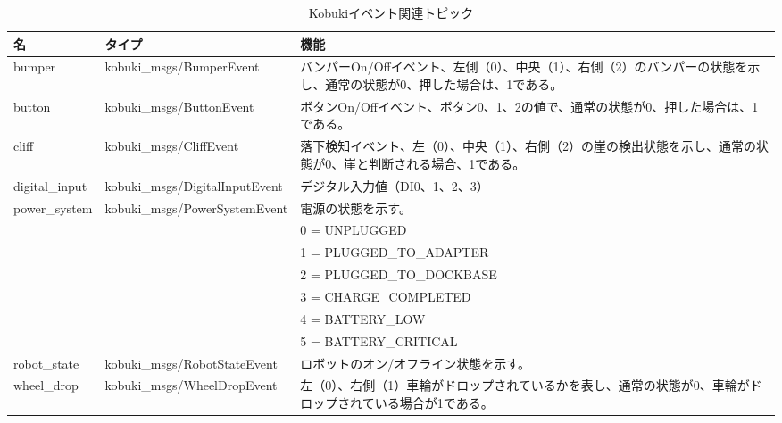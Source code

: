 \begin{itemize}
\begin{table}[htp]
\centering
\begin{tabular}{p{2cm} p{5cm} p{6cm}}
\toprule
\textbf{名} & \textbf{タイプ} & \textbf{機能}\\
\midrule
bumper & kobuki\_msgs/BumperEvent & バンパーOn/Offイベント、左側（0）、中央（1）、右側（2）のバンパーの状態を示し、通常の状態が0、押した場合は、1である。} \\
button & kobuki\_msgs/ButtonEvent & ボタンOn/Offイベント、ボタン0、1、2の値で、通常の状態が0、押した場合は、1である。\\
cliff & kobuki\_msgs/CliffEvent  & 落下検知イベント、左（0）、中央（1）、右側（2）の崖の検出状態を示し、通常の状態が0、崖と判断される場合、1である。 \\
digital\_input & kobuki\_msgs/DigitalInputEvent & デジタル入力値（DI0、1、2、3） \\
power\_system & kobuki\_msgs/PowerSystemEvent  & 電源の状態を示す。 \\
& & 0 = UNPLUGGED \\
& & 1 = PLUGGED\_TO\_ADAPTER \\
& & 2 = PLUGGED\_TO\_DOCKBASE \\
& & 3 = CHARGE\_COMPLETED  \\
& & 4 = BATTERY\_LOW \\
& & 5 = BATTERY\_CRITICAL \\
robot\_state & kobuki\_msgs/RobotStateEvent & ロボットのオン/オフライン状態を示す。\\
wheel\_drop  & kobuki\_msgs/WheelDropEvent  & 左（0）、右側（1）車輪がドロップされているかを表し、通常の状態が0、車輪がドロップされている場合が1である。\\
\bottomrule
\end{tabular}
\caption{Kobukiイベント関連トピック}
\end{table}



\end{itemize}
